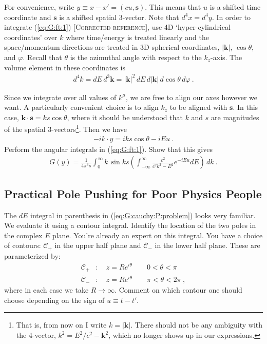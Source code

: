 \documentclass[12pt]{article}
\numberwithin{equation}{section}    %
\renewcommand{\vec}[1]{\mathbf{#1}} %
\begin{document}
For convenience, write $y \equiv x-x' = (cu,\mathbf{s})$. This means that $u$ is a shifted time coordinate and $\vec s$ is a shifted spatial 3-vector. Note that $d^4x = d^4 y$. In order to integrate \textcolor{green!50!black}{(\ref{eq:G:ft:1}) [\textsc{Corrected reference}]}, use 4D `hyper-cylindrical coordinates' over $k$ where time/energy is treated linearly and the space/momentum directions are treated in 3D spherical coordinates, $|\vec k|$, $\cos \theta$, and $\varphi$. Recall that $\theta$ is the azimuthal angle with respect to the $k_z$-axis. The volume element in these coordinates is
\begin{align}
	d^4 k = dE \, d^3\vec k = |\vec k|^2 \,dE \,  d|\vec k| \, d\cos \theta \, d\varphi \ .
\end{align}

Since we integrate over all values of $k^\mu$, we are free to align our axes however we want. A particularly convenient choice is to align $k_z$ to be aligned with $\vec s$. In this case, $\vec k \cdot \vec s = ks \cos \theta$, where it should be understood that $k$ and $s$ are magnitudes of the spatial $3$-vectors\footnote{That is, from now on I write $k = |\vec k|$. There should not be any ambiguity with the 4-vector, $k^2 = E^2/c^2 - \vec k^2$, which no longer shows up in our expressions.}.
%
Then we have
\begin{align}
	-ik\cdot y = i k s \cos \theta  - i E u \ .
\end{align}
Perform the angular integrals in (\ref{eq:G:ft:1}).  Show that this gives
\begin{align}
	G(y) = \frac{1}{4\pi^3 s} \int_0^\infty k\,\sin ks 
	\left(
	 \int_{-\infty}^\infty \frac{c^2}{c^2k^2 - E^2} e^{-iE u} dE
	\right) \, dk \ .
	\label{eq:G:cauchy:P:problem}
\end{align}





\subsection{Practical Pole Pushing for Poor Physics People}

The $dE$ integral in parenthesis in (\ref{eq:G:cauchy:P:problem}) looks very familiar. We evaluate it using a contour integral. Identify the location of the two poles in the complex $E$ plane.
%
You're already an expert on this integral.
%
You have a choice of contours: $\mathcal C_+$ in the upper half plane and $\bar{\mathcal C}_-$ in the lower half plane. These are parameterized by:
\begin{align}
	\mathcal C_+ &: \quad z = Re^{i\theta} \qquad  0 < \theta < \pi \\
	\bar{\mathcal C}_- &: \quad z = Re^{i\theta} \qquad \pi < \theta < 2 \pi \ ,
\end{align}
where in each case we take $R\to \infty$.
Comment on which contour one should choose depending on the sign of $u\equiv t-t'$.
\end{document}
